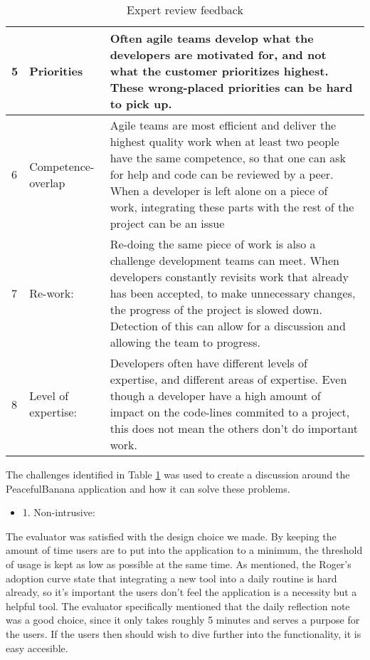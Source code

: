 \begin{table}[H]
\begin{tabularx}{\textwidth}{|l|l|X|}
    5  & Priorities          & Often agile teams develop what the developers are motivated for, and not what the customer prioritizes highest. These wrong-placed priorities can be hard to pick up.                                                                                                                                                                                          \\ \hline
    6  & Competence-overlap  & Agile teams are most efficient and deliver the highest quality work when at least two people have the same competence, so that one can ask for help and code can be reviewed by a peer. When a developer is left alone on a piece of work, integrating these parts with the rest of the project can be an issue                                                 \\ \hline
    7  & Re-work:            & Re-doing the same piece of work is also a challenge development teams can meet. When developers constantly revisits work that already has been accepted, to make unnecessary changes, the progress of the project is slowed down. Detection of this can allow for a discussion and allowing the team to progress.                                              \\ \hline
    8  & Level of expertise: & Developers often have different levels of expertise, and different areas of expertise. Even though a developer have a high amount of impact on the code-lines commited to a project, this does not mean the others don't do important work.                                                                                                                    \\ \hline
    \end{tabularx}
    \caption {Expert review feedback}
    \label{experttable}
\end{table}
\clearpage
The challenges identified in Table \ref{experttable} was used to create a discussion around the PeacefulBanana application and how it can solve these problems. 
\begin{itemize}
    \item 1. Non-intrusive:
\end{itemize}
The evaluator was satisfied with the design choice we made. By keeping the amount of time users are  to put into the application to a minimum, the threshold of usage is kept as low as possible at the same time. As mentioned, the Roger's adoption curve state that integrating a new tool into a daily routine is hard already, so it's important the users don't feel the application is a necessity but a helpful tool. The evaluator specifically mentioned that the daily reflection note was a good choice, since it only takes roughly 5 minutes and serves a purpose for the users. If the users then should wish to dive further into the functionality, it is easy accesible. 

